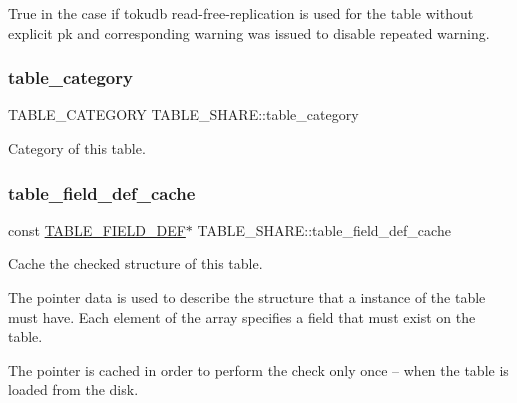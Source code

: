 True in the case if tokudb read-\/free-\/replication is used for the table without explicit pk and corresponding warning was issued to disable repeated warning. \mbox{\label{structTABLE__SHARE_aaf3e5f8c4f8f32d7e7b3451800e03243}} 
\subsubsection{\texorpdfstring{table\+\_\+category}{table\_category}}
{\footnotesize\ttfamily T\+A\+B\+L\+E\+\_\+\+C\+A\+T\+E\+G\+O\+RY T\+A\+B\+L\+E\+\_\+\+S\+H\+A\+R\+E\+::table\+\_\+category}

Category of this table. \mbox{\label{structTABLE__SHARE_a2eae47fa6d1ab98ea2af1b1073170274}} 
\subsubsection{\texorpdfstring{table\+\_\+field\+\_\+def\+\_\+cache}{table\_field\_def\_cache}}
{\footnotesize\ttfamily const \mbox{\hyperlink{structst__table__field__def}{T\+A\+B\+L\+E\+\_\+\+F\+I\+E\+L\+D\+\_\+\+D\+EF}}$\ast$ T\+A\+B\+L\+E\+\_\+\+S\+H\+A\+R\+E\+::table\+\_\+field\+\_\+def\+\_\+cache}

Cache the checked structure of this table.

The pointer data is used to describe the structure that a instance of the table must have. Each element of the array specifies a field that must exist on the table.

The pointer is cached in order to perform the check only once -- when the table is loaded from the disk. \mbox{\label{structTABLE__SHARE_ae04c033776f1dc39863ebf60b842c505}} 
